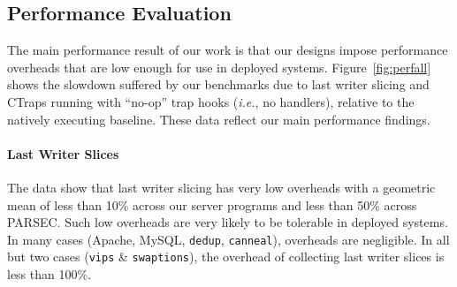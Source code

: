 \documentclass[preprint,9pt]{sigplanconf}
\newcommand{\addtodo}[1]{\textcolor{red}{[To do: #1]}}
\newcommand{\ctraps}{CTraps\xspace}
\begin{document}
%


\subsection{Performance Evaluation}
\label{sec:eval:perf}

The main performance result of our work is that our designs impose performance
overheads that are low enough for use in deployed systems.
Figure~\ref{fig:perfall} shows the slowdown suffered by our benchmarks due to last writer slicing
and \ctraps running with ``no-op'' trap hooks ({\em i.e.}, no
handlers), relative to the natively executing baseline.  These data reflect
our main performance findings.    

\paragraph{Last Writer Slices}
The data show that last writer slicing has very low overheads with a geometric mean of less
than 10\% across our server programs and less than 50\% across PARSEC.  Such
low overheads are very likely to be tolerable in deployed systems.  In many
cases (Apache, MySQL, {\tt dedup}, {\tt canneal}), overheads are negligible.
In all but two cases ({\tt vips} \& {\tt swaptions}), the overhead of collecting last writer slices is
less than 100\%.    
\end{document}
